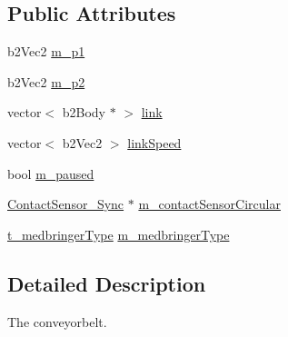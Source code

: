 \subsection*{Public Attributes}
\begin{DoxyCompactItemize}
\item 
b2\-Vec2 \hyperlink{classConveyorBelt_ad22553d91da070067703878c4059ecf5}{m\-\_\-p1}
\item 
b2\-Vec2 \hyperlink{classConveyorBelt_a061584c0f9fe736cd06d5b81472016dd}{m\-\_\-p2}
\item 
vector$<$ b2\-Body $\ast$ $>$ \hyperlink{classConveyorBelt_a21237fddbc2791faf8e26fd346ac8434}{link}
\item 
vector$<$ b2\-Vec2 $>$ \hyperlink{classConveyorBelt_a1dbc93fa0310c47d89f234602fc8610e}{link\-Speed}
\item 
bool \hyperlink{classConveyorBelt_a2325f44e6279a81a6927020e97f725a3}{m\-\_\-paused}
\item 
\hyperlink{classContactSensor__Sync}{Contact\-Sensor\-\_\-\-Sync} $\ast$ \hyperlink{classConveyorBelt_a35e3eacb4d9a46fd58505dba22a020c5}{m\-\_\-contact\-Sensor\-Circular}
\item 
\hyperlink{Conveyor_8h_a98261db3679be2885c0bdad13c27d7b1}{t\-\_\-medbringer\-Type} \hyperlink{classConveyorBelt_a92464da95aad2012ab4fcb0c1a998f42}{m\-\_\-medbringer\-Type}
\end{DoxyCompactItemize}


\subsection{Detailed Description}
The conveyorbelt. 


